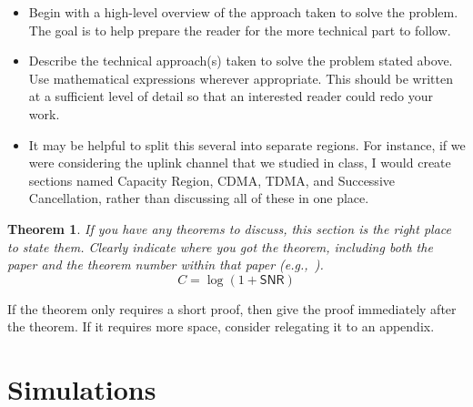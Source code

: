 \documentclass[article,11pt,onecolumn,final]{IEEEtran}
\newtheorem{theorem}{Theorem}
\begin{document}
\begin{itemize}

\item Begin with a high-level overview of the approach taken to solve the problem. The goal is to help prepare the reader for the more technical part to follow.

\item Describe the technical approach(s) taken to solve the problem stated above. Use mathematical expressions wherever appropriate. This should be written at a sufficient level of detail so that an interested reader could redo your work.

\item It may be helpful to split this several into separate regions. For instance, if we were considering the uplink channel that we studied in class, I would create sections named Capacity Region, CDMA, TDMA, and Successive Cancellation, rather than discussing all of these in one place. 

\end{itemize} 

\begin{theorem}
If you have any theorems to discuss, this section is the right place to state them. Clearly indicate where you got the theorem, including both the paper and the theorem number within that paper (e.g.,~\cite[Theorem 2]{Shannon1948}).
\begin{equation}
C = \log(1 + \mathsf{SNR}) \label{e:capacity}
\end{equation}
\end{theorem}
\begin{IEEEproof}
If the theorem only requires a short proof, then give the proof immediately after the theorem. If it requires more space, consider relegating it to an appendix. 
\end{IEEEproof}

\section{Simulations} 
\end{document}
